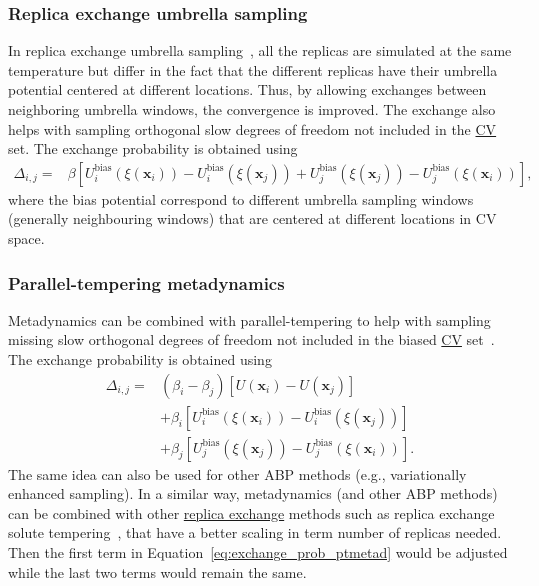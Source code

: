 \documentclass[9pt,review]{livecoms}
\newcommand{\vx}{\mathbf{x}}
\begin{document}
\subsubsection{Replica exchange umbrella sampling}
\label{sec:repex_umbrsampl}
In replica exchange umbrella sampling~\cite{Sugita2000_REUS}, all the replicas are simulated at the same temperature but differ in the fact that the different replicas have their umbrella potential centered at different locations. Thus, by allowing exchanges between neighboring umbrella windows, the convergence is improved. The exchange also helps with sampling orthogonal slow degrees of freedom not included in the \hyperlink{ref:CV} {CV} set. The exchange probability is obtained using
\begin{align}
\Delta_{i,j} = &
\beta \left[
U^{\mathrm{bias}}_{i}(\xi(\vx_{i})) - U^{\mathrm{bias}}_{i}(\xi(\vx_{j})) +
U^{\mathrm{bias}}_{j}(\xi(\vx_{j})) - U^{\mathrm{bias}}_{j}(\xi(\vx_{i}))
\right],
\end{align}
where the bias potential correspond to different umbrella sampling windows (generally neighbouring windows) that are centered at different locations in CV space.

\subsubsection{Parallel-tempering metadynamics}
Metadynamics can be combined with parallel-tempering to help with sampling missing slow orthogonal degrees of freedom not included in the biased \hyperlink{ref:CV} {CV} set~\cite{Bussi-JACS-2006}. The exchange probability is obtained using
\begin{align}
\label{eq:exchange_prob_ptmetad}
\Delta_{i,j} = &
\left(\beta_{i} - \beta_{j}\right)
\left[U(\vx_{i}) - U(\vx_{j})\right]
\nonumber \\ & +
\beta_{i} \left[
U^{\mathrm{bias}}_{i}(\xi(\vx_{i})) - U^{\mathrm{bias}}_{i}(\xi(\vx_{j}))
\right]
\nonumber \\ & +
\beta_{j} \left[
U^{\mathrm{bias}}_{j}(\xi(\vx_{j})) - U^{\mathrm{bias}}_{j}(\xi(\vx_{i}))
\right].
\end{align}
The same idea can also be used for other ABP methods (e.g., variationally enhanced sampling). In a similar way, metadynamics (and other ABP methods) can be combined with other \hyperlink{ref:ReplEx} {replica exchange} methods such as replica exchange solute tempering~\cite{REST2_Wang_2011,HREX_Bussi_2013}, that have a better scaling in term number of replicas needed. Then the first term in Equation~\ref{eq:exchange_prob_ptmetad} would be adjusted while the last two terms would remain the same.
\end{document}
